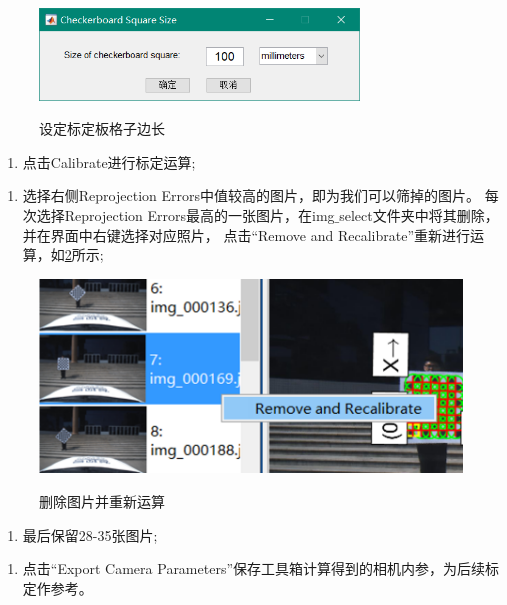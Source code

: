 \begin{figure}[htbp]
	\centering
    \includegraphics[width=8.5cm]{pic/3.png} \\
	\caption{设定标定板格子边长}\label{fig: pic3}
\end{figure}

\begin{enumerate}[\indent $3)$]
\item 点击Calibrate进行标定运算;
\end{enumerate}

\begin{enumerate}[\indent $4)$]
\item 选择右侧Reprojection Errors中值较高的图片，即为我们可以筛掉的图片。
每次选择Reprojection Errors最高的一张图片，在img$\_$select文件夹中将其删除，并在界面中右键选择对应照片，
点击“Remove and Recalibrate”重新进行运算，如\figurename\ref{fig: pic4}所示;
\end{enumerate}

\begin{figure}[htbp]
	\centering
    \includegraphics[width=12cm]{pic/4.png} \\
	\caption{删除图片并重新运算}\label{fig: pic4}
\end{figure}

\begin{enumerate}[\indent $5)$]
\item 最后保留28-35张图片;
\end{enumerate}

\begin{enumerate}[\indent $5)$]
\item 点击“Export Camera Parameters”保存工具箱计算得到的相机内参，为后续标定作参考。
\end{enumerate}

